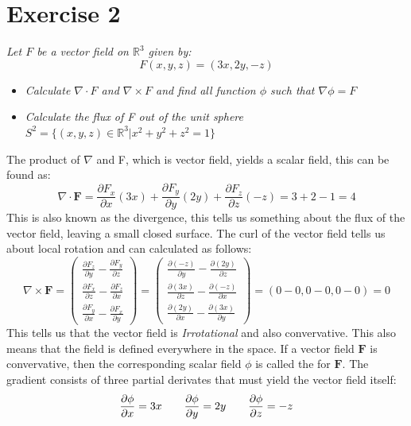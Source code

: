 \section{Exercise 2}
\textit{Let $F$ be a vector field on $\mathbb{R}^3$ given by:}
\[F(x,y,z) = (3x,2y,-z)\]
\begin{itemize}
    \item \textit{Calculate $\nabla \cdot F$ and $\nabla \times F$ and find all function $\phi$ such that $\nabla\phi = F$}
    \item \textit{Calculate the flux of F out of the unit sphere $S^2 = \{(x,y,z) \in \mathbb{R}^3 | x^2 + y^2 + z^2 = 1\}$}
\end{itemize}

The product of $\nabla$ and F, which is vector field, yields a scalar field, this can be found as:
\[\nabla \cdot \mathbf{F} = 
\frac{\partial F_x}{\partial x}(3x) +
\frac{\partial F_y}{\partial y}(2y) +
\frac{\partial F_z}{\partial z}(-z) = 3 + 2 - 1 = 4\]
This is also known as the divergence, this tells us something about the flux of the vector field, leaving a small
closed surface.
The curl of the vector field tells us about local rotation and can calculated as follows:
\[\nabla \times \mathbf{F} = 
\begin{pmatrix}
    \frac{\partial F_z}{\partial y} - \frac{\partial F_y}{\partial z}\\
    \frac{\partial F_x }{\partial z} - \frac{\partial F_z}{\partial x}\\
    \frac{\partial F_y}{\partial x} - \frac{\partial F_x}{\partial y}
\end{pmatrix}
=
\begin{pmatrix}
    \frac{\partial (-z)}{\partial y} - \frac{\partial (2y)}{\partial z}\\
    \frac{\partial (3x) }{\partial z} - \frac{\partial (-z)}{\partial x}\\
    \frac{\partial (2y)}{\partial x} - \frac{\partial (3x)}{\partial y}
\end{pmatrix}
= 
(0 - 0, 0 - 0, 0 - 0) = 0
\]
This tells us that the vector field is \textit{Irrotational} and also convervative. This also means that
the field is defined everywhere in the space.  
If a vector field $\mathbf{F}$ is convervative, then the corresponding scalar field $\phi$ is
called the  for $\textbf{F}$. 
The gradient consists of three partial derivates that must yield the vector field itself:
\[
\frac{\partial \phi}{\partial x} = 3x\\
\qquad
\frac{\partial \phi}{\partial y} = 2y\\
\qquad
\frac{\partial \phi}{\partial z} = -z\\
\]
